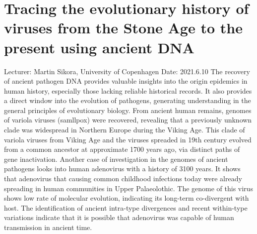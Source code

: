 \documentclass[11pt]{article}
\begin{document}
  \section{Tracing the evolutionary history of viruses from the Stone Age to the present using ancient DNA}
  Lecturer: Martin Sikora, University of Copenhagen
  \newline
  Date: 2021.6.10
  \newline
  The recovery of ancient pathogen DNA provides valuable insights into the origin epidemics in human history, especially those lacking reliable historical records. It also provides a direct window into the evolution of pathogens, generating understanding in the general principles of evolutionary biology.
  \newline 
  From ancient human remains, genomes of variola viruses (samllpox) were recovered, revealing that a previously unknown clade was widespread in Northern Europe during the Viking Age. This clade of variola viruses from Viking Age and the viruses spreaded in 19th century evolved from a common ancestor at approximate 1700 years ago, via distinct paths of gene inactivation.
  \newline
  Another case of investigation in the genomes of ancient pathogens looks into human adenovirus with a history of 3100 years. 
  It shows that adenovirus that causing common childhood infections today were already spreading in human communities in Upper Palaeolothic. The genome of this virus shows low rate of molecular evolution, indicating its long-term co-divergent with host. The identification of ancient intra-type divergences and recent within-type variations indicate that it is possible that adenovirus was capable of human transmission in ancient time.

  \newpage
\end{document}
